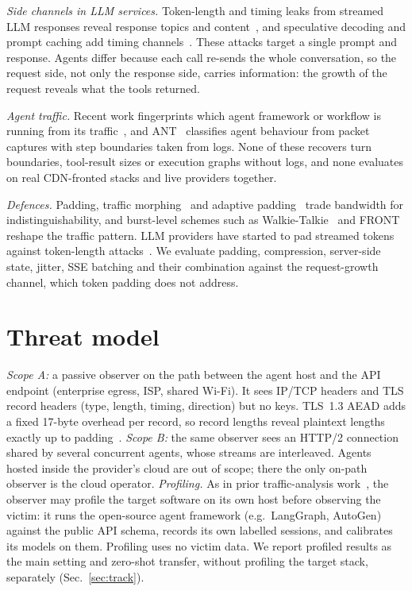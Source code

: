 \documentclass[journal]{IEEEtran}
\begin{document}
\emph{Side channels in LLM services.} Token-length and timing leaks from streamed LLM responses reveal response topics and content~\cite{weiss2024,whisperleak,netecho,length2content}, and speculative decoding and prompt caching add timing channels~\cite{carlini2024,earlybird,gu2025}. These attacks target a single prompt and response. Agents differ because each call re-sends the whole conversation, so the request side, not only the response side, carries information: the growth of the request reveals what the tools returned.

\emph{Agent traffic.} Recent work fingerprints which agent framework or workflow is running from its traffic~\cite{agentprint,kang2026,lugoloobi2026,dangol2026}, and ANT~\cite{ant} classifies agent behaviour from packet captures with step boundaries taken from logs. None of these recovers turn boundaries, tool-result sizes or execution graphs without logs, and none evaluates on real CDN-fronted stacks and live providers together.

\emph{Defences.} Padding, traffic morphing~\cite{wright2009} and adaptive padding~\cite{wtfpad} trade bandwidth for indistinguishability, and burst-level schemes such as Walkie-Talkie~\cite{walkietalkie} and FRONT~\cite{front} reshape the traffic pattern. LLM providers have started to pad streamed tokens against token-length attacks~\cite{whisperleak}. We evaluate padding, compression, server-side state, jitter, SSE batching and their combination against the request-growth channel, which token padding does not address.

\section{Threat model}\label{sec:threat}
\emph{Scope A:} a passive observer on the path between the agent host and the API endpoint (enterprise egress, ISP, shared Wi-Fi). It sees IP/TCP headers and TLS record headers (type, length, timing, direction) but no keys. TLS~1.3 AEAD adds a fixed 17-byte overhead per record, so record lengths reveal plaintext lengths exactly up to padding~\cite{wright2009}. \emph{Scope B:} the same observer sees an HTTP/2 connection shared by several concurrent agents, whose streams are interleaved. Agents hosted inside the provider's cloud are out of scope; there the only on-path observer is the cloud operator.
\emph{Profiling.} As in prior traffic-analysis work~\cite{whisperleak,df}, the observer may profile the target software on its own host before observing the victim: it runs the open-source agent framework (e.g.\ LangGraph, AutoGen) against the public API schema, records its own labelled sessions, and calibrates its models on them. Profiling uses no victim data. We report profiled results as the main setting and zero-shot transfer, without profiling the target stack, separately (Sec.~\ref{sec:track}).
\end{document}
